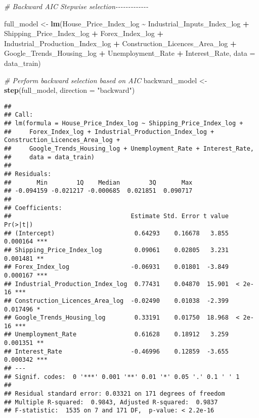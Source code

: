 \documentclass[
]{article}
\newenvironment{Shaded}{\begin{snugshade}}{\end{snugshade}}
\newcommand{\AttributeTok}[1]{\textcolor[rgb]{0.13,0.29,0.53}{#1}}
\newcommand{\CommentTok}[1]{\textcolor[rgb]{0.56,0.35,0.01}{\textit{#1}}}
\newcommand{\FunctionTok}[1]{\textcolor[rgb]{0.13,0.29,0.53}{\textbf{#1}}}
\newcommand{\NormalTok}[1]{#1}
\newcommand{\OtherTok}[1]{\textcolor[rgb]{0.56,0.35,0.01}{#1}}
\newcommand{\SpecialCharTok}[1]{\textcolor[rgb]{0.81,0.36,0.00}{\textbf{#1}}}
\newcommand{\StringTok}[1]{\textcolor[rgb]{0.31,0.60,0.02}{#1}}
\begin{document}
\begin{Shaded}
\begin{Highlighting}[]
\CommentTok{\# Backward AIC Stepwise selection{-}{-}{-}{-}{-}{-}{-}{-}{-}{-}{-}{-}{-}}

\NormalTok{full\_model }\OtherTok{\textless{}{-}} \FunctionTok{lm}\NormalTok{(House\_Price\_Index\_log }\SpecialCharTok{\textasciitilde{}}\NormalTok{ Industrial\_Inputs\_Index\_log }\SpecialCharTok{+}\NormalTok{ Shipping\_Price\_Index\_log }\SpecialCharTok{+}\NormalTok{ Forex\_Index\_log }\SpecialCharTok{+}\NormalTok{ Industrial\_Production\_Index\_log }\SpecialCharTok{+} 
\NormalTok{                   Construction\_Licences\_Area\_log }\SpecialCharTok{+}\NormalTok{ Google\_Trends\_Housing\_log }\SpecialCharTok{+} 
\NormalTok{                   Unemployment\_Rate }\SpecialCharTok{+}\NormalTok{ Interest\_Rate, }\AttributeTok{data =}\NormalTok{ data\_train)}

\CommentTok{\# Perform backward selection based on AIC}
\NormalTok{backward\_model }\OtherTok{\textless{}{-}} \FunctionTok{step}\NormalTok{(full\_model, }
                       \AttributeTok{direction =} \StringTok{"backward"}\NormalTok{)}
\end{Highlighting}
\end{Shaded}

\begin{verbatim}
## 
## Call:
## lm(formula = House_Price_Index_log ~ Shipping_Price_Index_log + 
##     Forex_Index_log + Industrial_Production_Index_log + Construction_Licences_Area_log + 
##     Google_Trends_Housing_log + Unemployment_Rate + Interest_Rate, 
##     data = data_train)
## 
## Residuals:
##       Min        1Q    Median        3Q       Max 
## -0.094159 -0.021217 -0.000685  0.021851  0.090717 
## 
## Coefficients:
##                                 Estimate Std. Error t value Pr(>|t|)    
## (Intercept)                      0.64293    0.16678   3.855 0.000164 ***
## Shipping_Price_Index_log         0.09061    0.02805   3.231 0.001481 ** 
## Forex_Index_log                 -0.06931    0.01801  -3.849 0.000167 ***
## Industrial_Production_Index_log  0.77431    0.04870  15.901  < 2e-16 ***
## Construction_Licences_Area_log  -0.02490    0.01038  -2.399 0.017496 *  
## Google_Trends_Housing_log        0.33191    0.01750  18.968  < 2e-16 ***
## Unemployment_Rate                0.61628    0.18912   3.259 0.001351 ** 
## Interest_Rate                   -0.46996    0.12859  -3.655 0.000342 ***
## ---
## Signif. codes:  0 '***' 0.001 '**' 0.01 '*' 0.05 '.' 0.1 ' ' 1
## 
## Residual standard error: 0.03321 on 171 degrees of freedom
## Multiple R-squared:  0.9843, Adjusted R-squared:  0.9837 
## F-statistic:  1535 on 7 and 171 DF,  p-value: < 2.2e-16
\end{verbatim}
\end{document}
